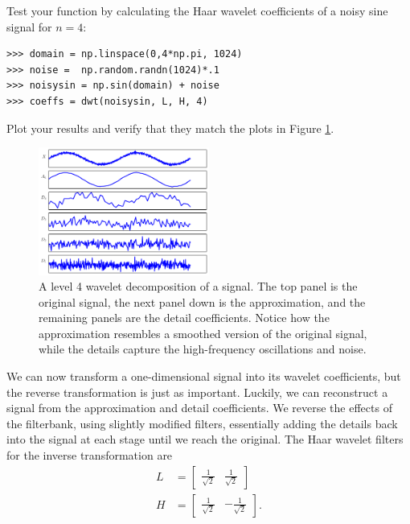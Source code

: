 Test your function by calculating the Haar wavelet coefficients of a noisy sine signal for $n=4$:
\begin{lstlisting}
>>> domain = np.linspace(0,4*np.pi, 1024)
>>> noise =  np.random.randn(1024)*.1
>>> noisysin = np.sin(domain) + noise
>>> coeffs = dwt(noisysin, L, H, 4)
\end{lstlisting}
Plot your results and verify that they match the plots in Figure \ref{fig:dwt1D}.

\begin{figure}
\centering
\includegraphics[width = 0.5\textwidth]{dwt1D}
\caption{A level 4 wavelet decomposition of a signal. The top panel is the original signal,
the next panel down is the approximation, and the remaining panels are the detail coefficients.
Notice how the approximation resembles a smoothed version of the original signal, while the
details capture the high-frequency oscillations and noise.}
\label{fig:dwt1D}
\end{figure}

We can now transform a one-dimensional signal into its wavelet coefficients,
but the reverse transformation is just as important.
Luckily, we can reconstruct a signal from the approximation and detail coefficients.
We reverse the effects of the filterbank, using slightly modified filters, essentially adding the details back into the
signal at each stage until we reach the original.
The Haar wavelet filters for the inverse transformation are
\begin{align*}
L &= \begin{bmatrix}\frac{1}{\sqrt{2}} & \frac{1}{\sqrt{2}}\end{bmatrix}\\
H &= \begin{bmatrix}\frac{1}{\sqrt{2}} & -\frac{1}{\sqrt{2}}\end{bmatrix}.
\end{align*}

